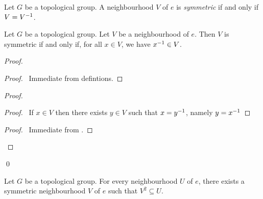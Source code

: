 \begin{definition}
    Let $G$ be a topological group. A neighbourhood $V$ of $e$ is \emph{symmetric}
    if and only if $V = {V}^{-1}$.
\end{definition}

\begin{lemma}
    \label{lemma:symmetric_neighbourhood}
    Let $G$ be a topological group. Let $V$ be a neighbourhood of $e$. Then $V$ is symmetric if and only if, for all $x \in V$, we have ${x}^{-1} \in V$.
\end{lemma}

\begin{proof}
    \pf
    \begin{proof}
        \pf\ Immediate from defintions.
    \end{proof}
    \begin{proof}
        \begin{proof}
            \pf\ If $x \in V$ then there exists $y \in V$ such that $x = {y}^{-1}$, namely $y = {x}^{-1}$
        \end{proof}
        \begin{proof}
            \pf\ Immediate from .
        \end{proof}
    \end{proof}
    \qed
\end{proof}

\begin{lemma}
    \label{lemma:symmetric_subneighbourhood}
    Let $G$ be a topological group. For every neighbourhood $U$ of $e$, there exists a symmetric neighbourhood $V$ of $e$ such that $V^2 \subseteq U$.
\end{lemma}

